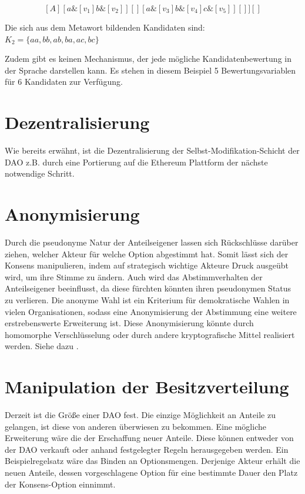 \documentclass[a4paper,12pt]{report}
\begin{document}
\[ [A][ a\&[v_1]b\&[v_2] ][][ a\&[v_3]b\&[v_4]c\&[v_5] ][] ][] \] 


Die sich aus dem Metawort bildenden Kandidaten sind: $K_2=\{ aa, bb, ab, ba, ac, bc \}$

Zudem gibt es keinen Mechanismus, der jede mögliche Kandidatenbewertung in der Sprache darstellen kann. Es stehen in diesem Beispiel 5 Bewertungsvariablen für 6 Kandidaten zur Verfügung. 

\section{Dezentralisierung}
Wie bereits erwähnt, ist die Dezentralisierung der Selbst-Modifikation-Schicht der DAO z.B. durch eine Portierung auf die Ethereum Plattform der nächste notwendige Schritt.

\section{Anonymisierung}
Durch die pseudonyme Natur der Anteilseigener lassen sich Rückschlüsse darüber ziehen, welcher Akteur für welche Option abgestimmt hat. Somit lässt sich der Konsens manipulieren, indem auf strategisch wichtige Akteure Druck ausgeübt wird, um ihre Stimme zu ändern. Auch wird das Abstimmverhalten der Anteilseigener beeinflusst, da diese fürchten könnten ihren pseudonymen Status zu verlieren. Die anonyme Wahl ist ein Kriterium für demokratische Wahlen in vielen Organisationen, sodass eine Anonymisierung der Abstimmung eine weitere erstrebenswerte Erweiterung ist. Diese Anonymisierung könnte durch homomorphe Verschlüsselung\cite{Gentry2009} oder durch andere kryptografische Mittel realisiert werden. Siehe dazu \cite{Fouard2007}.

\section{Manipulation der Besitzverteilung}
Derzeit ist die Größe einer DAO fest. Die einzige Möglichkeit an Anteile zu gelangen, ist diese von anderen überwiesen zu bekommen. Eine mögliche Erweiterung wäre die der Erschaffung neuer Anteile. Diese können entweder von der DAO verkauft oder anhand festgelegter Regeln herausgegeben werden. Ein Beispielregelsatz wäre das Binden an Optionsmengen. Derjenige Akteur erhält die neuen Anteile, dessen vorgeschlagene Option für eine bestimmte Dauer den Platz der Konsens-Option einnimmt.





\newpage

\nocite{Otto}
\nocite{Vasant2015}



\end{document}
